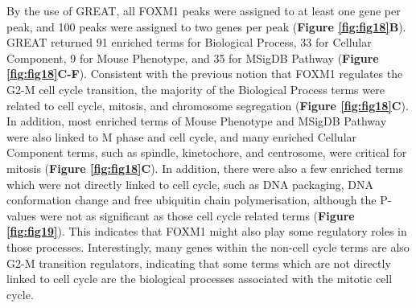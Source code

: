 By the use of GREAT, all FOXM1 peaks were assigned to at least one gene per peak, and 100 peaks were assigned to two genes per peak (\textbf{Figure \ref{fig:fig18}B}). GREAT returned 91 enriched terms for Biological Process, 33 for Cellular Component, 9 for Mouse Phenotype, and 35 for MSigDB Pathway (\textbf{Figure \ref{fig:fig18}C-F}). Consistent with the previous notion that FOXM1 regulates the G2-M cell cycle transition, the majority of the Biological Process terms were related to cell cycle, mitosis, and chromosome segregation (\textbf{Figure \ref{fig:fig18}C}). In addition, most enriched terms of Mouse Phenotype and MSigDB Pathway were also linked to M phase and cell cycle, and many enriched Cellular Component terms, such as spindle, kinetochore, and centrosome, were critical for mitosis (\textbf{Figure \ref{fig:fig18}C}). In addition, there were also a few enriched terms which were not directly linked to cell cycle, such as DNA packaging, DNA conformation change and free ubiquitin chain polymerisation, although the P-values were not as significant as those cell cycle related terms (\textbf{Figure \ref{fig:fig19}}). This indicates that FOXM1 might also play some regulatory roles in those processes. Interestingly, many genes within the non-cell cycle terms are also G2-M transition regulators, indicating that some terms which are not directly linked to cell cycle are the biological processes associated with the mitotic cell cycle.

